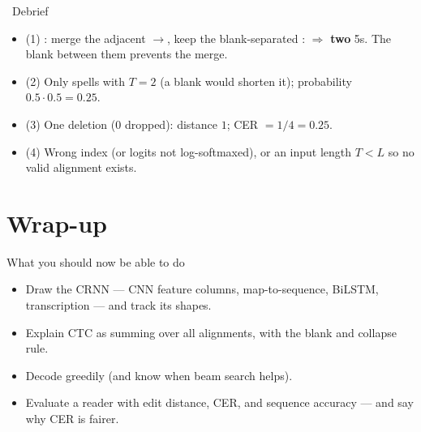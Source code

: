 \documentclass[10pt,aspectratio=169]{beamer}
\begin{document}
\begin{frame}{\faPen~Debrief}
  \begin{itemize}
    \item (1) : merge the adjacent $\to$, keep the blank-separated :  $\Rightarrow$ \textbf{two} 5s. The blank between them prevents the merge.
    \item (2) Only  spells  with $T{=}2$ (a blank would shorten it); probability $0.5\cdot0.5=0.25$.
    \item (3) One deletion ($0$ dropped): distance $1$; CER $=1/4=0.25$.
    \item (4) Wrong  index (or logits not log-softmaxed), or an input length $T<L$ so no valid alignment exists.
  \end{itemize}
\end{frame}

\section{Wrap-up}

\begin{frame}{What you should now be able to do}
  \begin{itemize}
    \item Draw the CRNN --- CNN feature columns, map-to-sequence, BiLSTM, transcription --- and track its shapes.
    \item Explain CTC as summing over all alignments, with the blank and collapse rule.
    \item Decode greedily (and know when beam search helps).
    \item Evaluate a reader with edit distance, CER, and sequence accuracy --- and say why CER is fairer.
  \end{itemize}
\end{frame}
\end{document}
